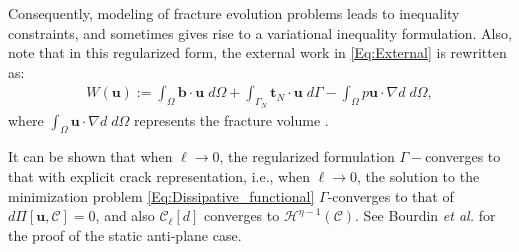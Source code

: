 Consequently, modeling of fracture evolution problems leads to {inequality constraints, and sometimes gives rise to a variational inequality formulation}.
Also, note that in this regularized form, the external work in \eqref{Eq:External} is rewritten as:
\begin{equation*}
\begin{aligned}
W(\bm{u}):=\int_{\Omega} \bm{b} \cdot \bm{u} \; d\Omega+\int_{\Gamma_N} \bm{t}_N\cdot \bm{u} \; d\Gamma - \int_{\Omega} p\bm{u}\cdot\nabla d \; d\Omega,
\end{aligned}
\end{equation*}
where $\int_{\Omega} \bm{u}\cdot\nabla d \; d\Omega$ represents the fracture volume \cite{BourdinCFRAC13}.

It can be shown that when $\ell\rightarrow 0$, the regularized formulation $\Gamma-$converges to that with explicit crack representation, i.e., when $\ell\rightarrow0$, the solution to the minimization problem \eqref{Eq:Dissipative_functional} $\Gamma$-converges to that of $d\Pi[\bm{u},\mathcal{C}]=0$, and also $\mathcal{C}_\ell[d]$ converges to $\mathcal{H}^{\eta-1}(\mathcal{C})$. See Bourdin \emph{et al.} \cite{bourdin2008variational} for the proof of the static anti-plane case.


